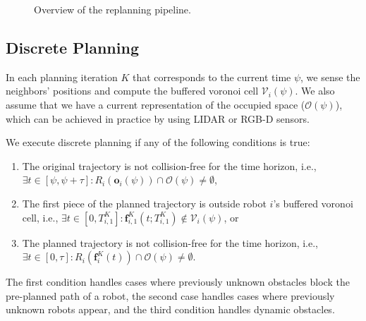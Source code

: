 \documentclass{svproc}
\newcommand{\vf}{\mathbf{f}}
\newcommand{\vo}{\mathbf{o}}
\newcommand{\cV}{\mathcal{V}}
\newcommand{\cO}{\mathcal{O}}
\newcommand{\todo}[1]{\textbf{\textcolor{red}{TODO: #1}}}
\begin{document}
\begin{figure}
{
}
\caption{Overview of the replanning pipeline.
}
\label{fig:flowchart}
\end{figure}


\subsection{Discrete Planning} \label{discretePlanning}

In each planning iteration $K$ that corresponds to the current time $\psi$, we sense the neighbors' positions and compute the buffered voronoi cell $\cV_i(\psi)$.
We also assume that we have a current representation of the occupied space ($\cO(\psi)$), which can be achieved in practice by using LIDAR or RGB-D sensors.

We execute discrete planning if any of the following conditions is true:
\begin{enumerate}
    \item The original trajectory is not collision-free for the time horizon, i.e., $\exists t\in [\psi,\psi+\tau] : R_i(\vo_i(\psi)) \cap \cO(\psi) \neq \emptyset$,
    \item The first piece of the planned trajectory is outside robot $i$'s buffered voronoi cell, i.e., $\exists t\in [0, T^{K}_{i,1}] : \vf^{K}_{i,1}(t; T^{K}_{i,1}) \not\in \cV_i(\psi)$, or
    \item The planned trajectory is not collision-free for the time horizon, i.e., $\exists t\in [0,\tau] :  R_i(\vf^{K}_i(t)) \cap \cO(\psi) \neq \emptyset$.
\end{enumerate}
The first condition handles cases where previously unknown obstacles block the pre-planned path of a robot, the second case handles cases where previously unknown robots appear, and the third condition handles dynamic obstacles.
\end{document}
